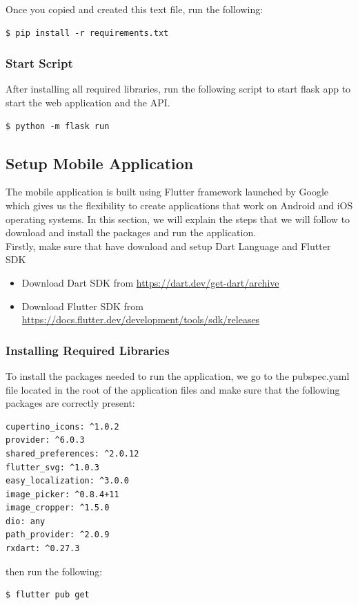 \noindent
Once you copied and created this text file, run the following:

\begin{verbatim}
$ pip install -r requirements.txt
\end{verbatim}

\subsubsection{Start Script}
After installing all required libraries, run the following script to start flask app to start the web application and the API.

\begin{verbatim}
$ python -m flask run
\end{verbatim}

\subsection{Setup Mobile Application}
The mobile application is built using Flutter framework launched by Google which gives us the flexibility to create applications that work on Android and iOS operating systems.
In this section, we will explain the steps that we will follow to download and install the packages and run the application. \\

\noindent
Firstly, make sure that have download and setup Dart Language and Flutter SDK

\begin{itemize}[itemsep=1pt, topsep=5pt]
    \item Download Dart SDK from \href{https://dart.dev/get-dart/archive}{https://dart.dev/get-dart/archive}
    \item Download Flutter SDK from \href{https://docs.flutter.dev/development/tools/sdk/releases}{https://docs.flutter.dev/development/tools/sdk/releases} 
\end{itemize}  

\subsubsection{Installing Required Libraries}
To install the packages needed to run the application, we go to the pubspec.yaml file located in the root of the application files and make sure that the following packages are correctly present:
\begin{verbatim}
cupertino_icons: ^1.0.2
provider: ^6.0.3
shared_preferences: ^2.0.12
flutter_svg: ^1.0.3
easy_localization: ^3.0.0
image_picker: ^0.8.4+11
image_cropper: ^1.5.0
dio: any
path_provider: ^2.0.9
rxdart: ^0.27.3
\end{verbatim}
then run the following:
\begin{verbatim}
$ flutter pub get
\end{verbatim}


